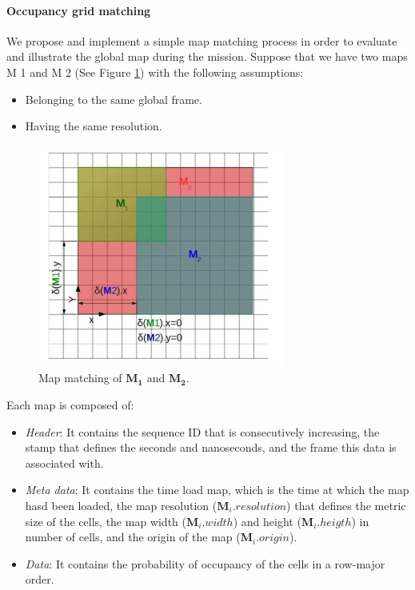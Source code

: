 \paragraph{Occupancy grid matching}
We propose and implement a simple map matching process in order to evaluate and illustrate the global map during the mission. Suppose that we have two maps M 1 and M 2 (See Figure \ref{fig:2.8}) with the following assumptions:
\begin{itemize}
    \item Belonging to the same global frame.
    \item Having the same resolution.
\end{itemize}
\begin{figure}[H]
    \centering
    \includegraphics[width=\linewidth]{assets/2_8.png}
    \caption{Map matching of $\mathbf{M_1}$ and $\mathbf{M_2}$.}
    \label{fig:2.8}
\end{figure}
Each map is composed of:
\begin{itemize}
    \item \textit{Header}: It contains the sequence ID that is consecutively increasing, the stamp that deﬁnes the seconds and nanoseconds, and the frame this data is associated with.
    \item \textit{Meta data}: It contains the time load map, which is the time at which the map hasd been loaded, the map resolution ($\mathbf{M}_i.resolution$) that deﬁnes the metric size of the cells, the map width ($\mathbf{M}_i.width$) and height ($\mathbf{M}_i.heigth$) in number of cells, and the origin of the map ($\mathbf{M}_i.origin$).
    \item \textit{Data}: It contains the probability of occupancy of the cells in a row-major order.
\end{itemize}
